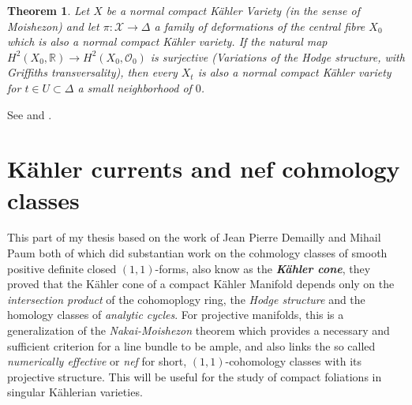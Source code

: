 \documentclass[12pt,twoside,a4paper]{report}
\newtheorem{theorem}{Theorem}[section]
\newcommand{\re}{\ensuremath{\mathbb R }}
\newcommand{\osheaf}{\ensuremath{\mathcal O }}
\begin{document}
\begin{theorem}
  Let $X$ be a normal compact Kähler Variety (in the sense of Moishezon) and let $\pi:\mathcal{X}\to\Delta$ a family of deformations of the central fibre $X_0$ which is also a normal compact Kähler variety. If the natural map $H^2(X_0,\re)\to H^2(X_0,\osheaf_0)$ is surjective (Variations of the Hodge structure, with Griffiths transversality), then every $X_t$ is also a normal compact Kähler variety for $t\in U\subset\Delta$ a small neighborhood of $0$.
  \end{theorem}
See \cite{Moishezon} and \cite{Varouchas}.
\section{Kähler currents and nef cohmology classes}
This part of my thesis based on the work of Jean Pierre Demailly and Mihail Paum both of which did substantian work on the cohmology classes of smooth positive definite closed $(1,1)$-forms, also know as the \emph{\bf Kähler cone}, they proved that the Kähler cone of a compact Kähler Manifold depends only on the \emph{intersection product} of the cohomoplogy ring, the \emph{Hodge structure} and the homology classes of \emph{analytic cycles}. For projective manifolds, this is a generalization of the \emph{Nakai-Moishezon} theorem which provides a necessary and sufficient criterion for a line bundle to be ample, and also links the so called \emph{numerically effective} or \emph{nef} for short, $(1,1)$-cohomology classes with its projective structure. This will be useful for the study of compact foliations in singular Kählerian varieties.
\end{document}
